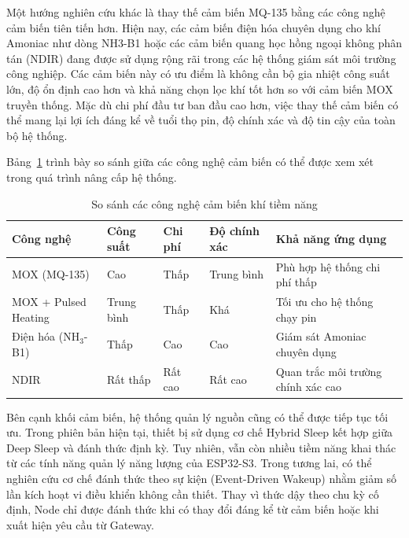 Một hướng nghiên cứu khác là thay thế cảm biến MQ-135 bằng các công nghệ cảm biến tiên tiến hơn. Hiện nay, các cảm biến điện hóa chuyên dụng cho khí Amoniac như dòng NH3-B1 hoặc các cảm biến quang học hồng ngoại không phân tán (NDIR) đang được sử dụng rộng rãi trong các hệ thống giám sát môi trường công nghiệp. Các cảm biến này có ưu điểm là không cần bộ gia nhiệt công suất lớn, độ ổn định cao hơn và khả năng chọn lọc khí tốt hơn so với cảm biến MOX truyền thống. Mặc dù chi phí đầu tư ban đầu cao hơn, việc thay thế cảm biến có thể mang lại lợi ích đáng kể về tuổi thọ pin, độ chính xác và độ tin cậy của toàn bộ hệ thống.

Bảng~\ref{tab:sensor_compare_future} trình bày so sánh giữa các công nghệ cảm biến có thể được xem xét trong quá trình nâng cấp hệ thống.

\begin{table}[H]
\centering
\caption{So sánh các công nghệ cảm biến khí tiềm năng}
\label{tab:sensor_compare_future}
\begin{tabular}{p{3cm} p{2cm} p{2.2cm} p{3cm} p{3.5cm}}
\hline
\textbf{Công nghệ} &
\textbf{Công suất} &
\textbf{Chi phí} &
\textbf{Độ chính xác} &
\textbf{Khả năng ứng dụng} \\
\hline
MOX (MQ-135) &
Cao &
Thấp &
Trung bình &
Phù hợp hệ thống chi phí thấp \\

MOX + Pulsed Heating &
Trung bình &
Thấp &
Khá &
Tối ưu cho hệ thống chạy pin \\

Điện hóa (NH$_3$-B1) &
Thấp &
Cao &
Cao &
Giám sát Amoniac chuyên dụng \\

NDIR &
Rất thấp &
Rất cao &
Rất cao &
Quan trắc môi trường chính xác cao \\
\hline
\end{tabular}
\end{table}

Bên cạnh khối cảm biến, hệ thống quản lý nguồn cũng có thể được tiếp tục tối ưu. Trong phiên bản hiện tại, thiết bị sử dụng cơ chế Hybrid Sleep kết hợp giữa Deep Sleep và đánh thức định kỳ. Tuy nhiên, vẫn còn nhiều tiềm năng khai thác từ các tính năng quản lý năng lượng của ESP32-S3. Trong tương lai, có thể nghiên cứu cơ chế đánh thức theo sự kiện (Event-Driven Wakeup) nhằm giảm số lần kích hoạt vi điều khiển không cần thiết. Thay vì thức dậy theo chu kỳ cố định, Node chỉ được đánh thức khi có thay đổi đáng kể từ cảm biến hoặc khi xuất hiện yêu cầu từ Gateway.

